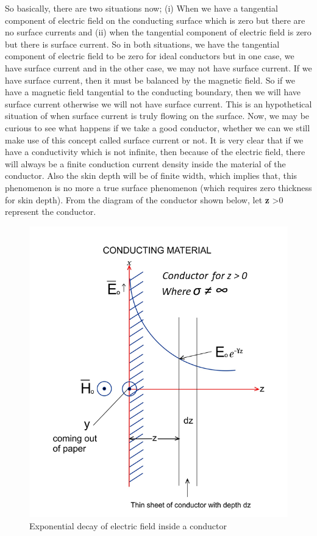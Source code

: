 So basically, there are two situations now; (i) When we have a tangential component of electric field on the conducting surface which is zero but there are no surface currents and (ii) when the tangential component of electric field is zero but there is surface current. So in both situations, we have the tangential component of electric field to be zero for ideal conductors but in one case, we have surface current and in the other case, we may not have surface current. If we have surface current, then it must be balanced by the magnetic field. So if we have a magnetic field tangential to the conducting boundary, then we will have surface current otherwise we will not have surface current. This is an hypothetical situation of when surface current is truly flowing on the surface. Now, we may be curious to see what happens if we take a good conductor, whether we can we still make use of this concept called surface current or not. It is very clear that if we have a conductivity which is not infinite, then because of the electric field, there will always be a finite conduction current density inside the material of the conductor. Also the skin depth will be of finite width, which implies that, this phenomenon is no more a true surface phenomenon (which requires zero thickness for skin depth). From the diagram of the conductor shown below, let \textbf{z} \textgreater 0 represent the conductor.
\begin{figure}[h]
\centering
\includegraphics[width=0.9\linewidth]{./graphics/thin_sheet_conductor}
\caption{Exponential decay of electric field inside a conductor}
\label{exponential_decay_of_E_in_conductor}
\end{figure}	

